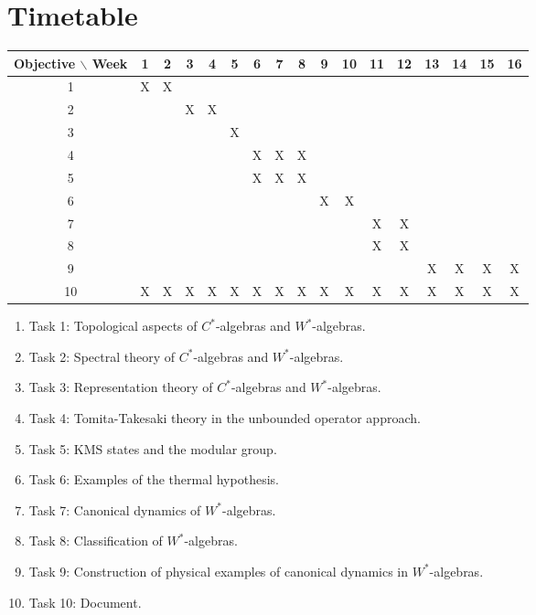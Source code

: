 \documentclass{article}
\begin{document}
\section{Timetable}

\begin{table}[htb]
	\begin{tabular}{|c|cccccccccccccccc| }
	\hline
	Objective $\backslash$ Week & 1 & 2 & 3 & 4 & 5 & 6 & 7 & 8 & 9 & 10 & 11 & 12 & 13 & 14 & 15 & 16  \\
	\hline
	1 & X & X &   &   &   &   &   &   &   &   &   &   &   &   &   &   \\
	2 &   &   & X & X &   &   &   &   &   &   &   &   &   &   &   &   \\
	3 &   &   &   &   & X &   &   &   &   &   &   &   &   &   &   &   \\
	4 &   &   &   &   &   & X & X & X &   &   &   &   &   &   &   &   \\
	5 &   &   &   &   &   & X & X & X &   &   &   &   &   &   &   &   \\
	6 &   &   &   &   &   &   &   &   & X &
X &   &   &   &   &   &   \\
	7 &   &   &   &   &   &   &   &   &   &
& X & X &   &   &   &   \\
	8 &   &   &   &   &   &   &   &   &   &
& X & X &   &   &   &   \\
	9 &   &   &   &   &   &   &   &   &   &
&   &   & X & X & X & X \\
	10 & X & X & X & X & X & X & X & X & X &
X & X & X & X & X & X & X \\
	\hline
	\end{tabular}
\end{table}
\vspace{1mm}

\begin{enumerate}
	\item Task 1: Topological aspects of $C^*$-algebras and $W^*$-algebras.
	\item Task 2: Spectral theory of $C^*$-algebras and $W^*$-algebras.
	\item Task 3: Representation theory of $C^*$-algebras and $W^*$-algebras.
	\item Task 4: Tomita-Takesaki theory in the unbounded operator approach.
	\item Task 5: KMS states and the modular group.
	\item Task 6: Examples of the thermal hypothesis.
	\item Task 7: Canonical dynamics of $W^*$-algebras.
	\item Task 8: Classification of $W^*$-algebras.
	\item Task 9: Construction of physical examples of canonical dynamics in $W^*$-algebras.
	\item Task 10: Document.
\end{enumerate}
\end{document}
